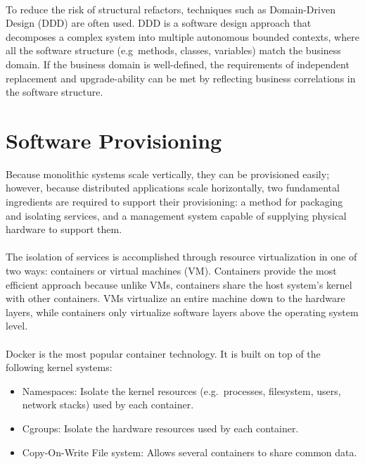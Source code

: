 \paragraph{}

To reduce the risk of structural refactors, techniques such as Domain-Driven Design (DDD) \cite{ddd} are often used.
DDD is a software design approach that decomposes a complex system into multiple autonomous bounded contexts,
where all the software structure (e.g\ methods, classes, variables) match the business domain.
If the business domain is well-defined, the requirements of independent replacement and upgrade-ability can be met by reflecting business correlations in the software structure.

\section{Software Provisioning} %
\label{sec:software_provisioning}

Because monolithic systems scale vertically, they can be provisioned easily;
however, because distributed applications scale horizontally, two fundamental ingredients are required to support their provisioning:
a method for packaging and isolating services,
and a management system capable of supplying physical hardware to support them.

\paragraph{}

The isolation of services is accomplished through resource virtualization in one of two ways: containers or virtual machines (VM).
Containers provide the most efficient approach because unlike VMs, containers share the host system’s kernel with other containers.
VMs virtualize an entire machine down to the hardware layers, while containers only virtualize software layers above the operating system level.

\paragraph{}

Docker \cite{docker} is the most popular container technology. It is built on top of the following kernel systems:
\begin{itemize}
    \item Namespaces: Isolate the kernel resources (e.g.\ processes, filesystem, users, network stacks) used by each container.
    \item Cgroups: Isolate the hardware resources used by each container.
    \item Copy-On-Write File system: Allows several containers to share common data.
\end{itemize}

